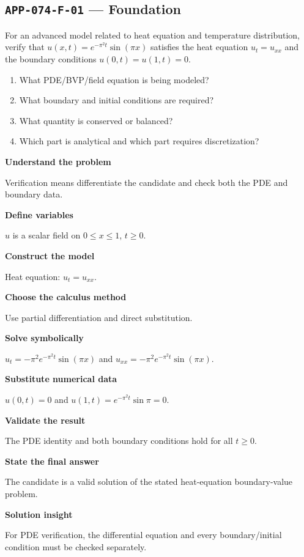 \documentclass[11pt]{book}
\newcommand{\pid}[1]{\texttt{#1}}
\begin{document}
\subsection*{\pid{APP-074-F-01} — Foundation}
\begin{problembox}
For an advanced model related to heat equation and temperature distribution, verify that $u(x,t)=e^{-\pi^2t}\sin(\pi x)$ satisfies the heat equation $u_t=u_{xx}$ and the boundary conditions $u(0,t)=u(1,t)=0$.
\end{problembox}
\begin{promptbox}\begin{enumerate}
\item What PDE/BVP/field equation is being modeled?
\item What boundary and initial conditions are required?
\item What quantity is conserved or balanced?
\item Which part is analytical and which part requires discretization?
\end{enumerate}\end{promptbox}
\begin{solutionbox}
\textbf{Understand the problem}\par Verification means differentiate the candidate and check both the PDE and boundary data.\par\medskip
\textbf{Define variables}\par $u$ is a scalar field on $0\le x\le1$, $t\ge0$.\par\medskip
\textbf{Construct the model}\par Heat equation: $u_t=u_{xx}$.\par\medskip
\textbf{Choose the calculus method}\par Use partial differentiation and direct substitution.\par\medskip
\textbf{Solve symbolically}\par $u_t=-\pi^2 e^{-\pi^2t}\sin(\pi x)$ and $u_{xx}=-\pi^2 e^{-\pi^2t}\sin(\pi x)$.\par\medskip
\textbf{Substitute numerical data}\par $u(0,t)=0$ and $u(1,t)=e^{-\pi^2t}\sin\pi=0$.\par\medskip
\textbf{Validate the result}\par The PDE identity and both boundary conditions hold for all $t\ge0$.\par\medskip
\textbf{State the final answer}\par The candidate is a valid solution of the stated heat-equation boundary-value problem.\par\medskip
\textbf{Solution insight}\par For PDE verification, the differential equation and every boundary/initial condition must be checked separately.\par\medskip
\end{solutionbox}
\end{document}
